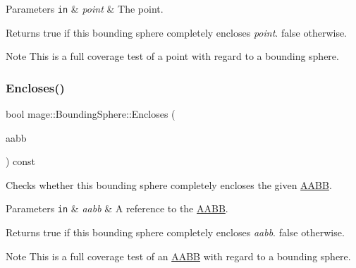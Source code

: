 \begin{DoxyParams}[1]{Parameters}
\mbox{\tt in}  & {\em point} & The point. \\
\hline
\end{DoxyParams}
\begin{DoxyReturn}{Returns}
{\ttfamily true} if this bounding sphere completely encloses {\itshape point}. {\ttfamily false} otherwise. 
\end{DoxyReturn}
\begin{DoxyNote}{Note}
This is a full coverage test of a point with regard to a bounding sphere. 
\end{DoxyNote}
\hypertarget{classmage_1_1_bounding_sphere_a35feaaaf141319bdf37fca4da0ed0fc0}{}\label{classmage_1_1_bounding_sphere_a35feaaaf141319bdf37fca4da0ed0fc0} 
\subsubsection{\texorpdfstring{Encloses()}{Encloses()}\hspace{0.1cm}{\footnotesize\ttfamily [3/4]}}
{\footnotesize\ttfamily bool mage\+::\+Bounding\+Sphere\+::\+Encloses (\begin{DoxyParamCaption}\item[{const \hyperlink{classmage_1_1_a_a_b_b}{A\+A\+BB} \&}]{aabb }\end{DoxyParamCaption}) const\hspace{0.3cm}{\ttfamily [noexcept]}}

Checks whether this bounding sphere completely encloses the given \hyperlink{classmage_1_1_a_a_b_b}{A\+A\+BB}.


\begin{DoxyParams}[1]{Parameters}
\mbox{\tt in}  & {\em aabb} & A reference to the \hyperlink{classmage_1_1_a_a_b_b}{A\+A\+BB}. \\
\hline
\end{DoxyParams}
\begin{DoxyReturn}{Returns}
{\ttfamily true} if this bounding sphere completely encloses {\itshape aabb}. {\ttfamily false} otherwise. 
\end{DoxyReturn}
\begin{DoxyNote}{Note}
This is a full coverage test of an \hyperlink{classmage_1_1_a_a_b_b}{A\+A\+BB} with regard to a bounding sphere. 
\end{DoxyNote}
\hypertarget{classmage_1_1_bounding_sphere_ac5989739e15d3525bbb805f9c457ad4d}{}\label{classmage_1_1_bounding_sphere_ac5989739e15d3525bbb805f9c457ad4d} 
